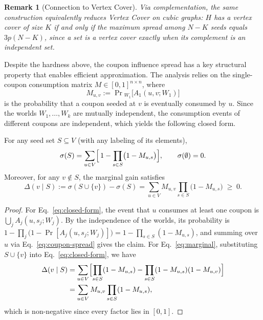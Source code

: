 \documentclass[sigconf]{acmart}
\newtheorem{remark}{Remark}[section]
\begin{document}
\begin{remark}[Connection to Vertex Cover]
\label{rem:vc}
Via complementation, the same construction equivalently reduces
Vertex Cover on cubic graphs: $H$ has a vertex cover of size $K$ if
and only if the maximum spread among $N-K$ seeds equals $3p(N-K)$,
since a set is a vertex cover exactly when its complement is an
independent set.
\end{remark}

Despite the hardness above, the coupon influence spread has a key
structural property that enables efficient approximation.
The analysis relies on the single-coupon consumption matrix
$M\in[0,1]^{n\times n}$, where
\begin{equation}
\label{eq:consume-prob}
M_{u,v}
:=
\Pr{}_{W_1}\bigl[A_1(u,v;W_1)\bigr]
\end{equation}
is the probability that a coupon seeded at $v$ is eventually consumed
by $u$.
Since the worlds $W_1,\ldots,W_k$ are mutually independent, the
consumption events of different coupons are independent, which yields
the following closed form.

\begin{lemma}
\label{lem:closed-form}
For any seed set $S\subseteq V$ (with any labeling of its elements),
\begin{equation}
\label{eq:closed-form}
\sigma(S)
=
\sum_{u\in V}\Bigl[\,1-\prod_{s\in S}\bigl(1-M_{u,s}\bigr)\Bigr],
\qquad
\sigma(\emptyset)=0.
\end{equation}
Moreover, for any $v\notin S$, the marginal gain satisfies
\begin{equation}
\label{eq:marginal}
\Delta(v\mid S)
:=
\sigma(S\cup\{v\})-\sigma(S)
=
\sum_{u\in V} M_{u,v}\prod_{s\in S}\bigl(1-M_{u,s}\bigr)
\;\ge\; 0.
\end{equation}
\end{lemma}

\begin{proof}
For Eq.~\eqref{eq:closed-form}, the event that $u$ consumes at least
one coupon is $\bigcup_{j} A_j(u,s_j;W_j)$. By the independence of
the worlds, its probability is
$1-\prod_{j}\bigl(1-\Pr[A_j(u,s_j;W_j)]\bigr)
=1-\prod_{s\in S}(1-M_{u,s})$, and summing over $u$ via
Eq.~\eqref{eq:coupon-spread} gives the claim.
For Eq.~\eqref{eq:marginal}, substituting $S\cup\{v\}$ into
Eq.~\eqref{eq:closed-form}, we have
\begin{align}
\Delta(v\mid S)
&=
\sum_{u\in V}
\Bigl[\prod_{s\in S}(1-M_{u,s})
-\prod_{s\in S}(1-M_{u,s})(1-M_{u,v})\Bigr]\nonumber\\
&=
\sum_{u\in V}M_{u,v}\prod_{s\in S}(1-M_{u,s}),
\end{align}
which is non-negative since every factor lies in $[0,1]$.
\end{proof}
\end{document}
